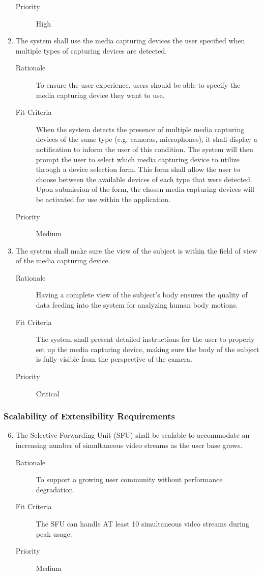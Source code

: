\documentclass{article}
\begin{document}
\begin{enumerate}[label=\textbf{PR\arabic*}]
\begin{description}
	\item[Priority] High
  \end{description}
\item The system shall use the media capturing devices the user specified when
  multiple types of capturing devices are detected. \label{PR13}
	\begin{description}
  \item[Rationale] To ensure the user experience, users should be able to specify
    the media capturing device they want to use.
	\item[Fit Criteria] When the system detects the presence of multiple media
    capturing devices of the same type (e.g. cameras, microphones), it shall
    display a notification to inform the user of this condition. The system will
    then prompt the user to select which media capturing device to utilize
    through a device selection form. This form shall allow the user to choose
    between the available devices of each type that were detected. Upon
    submission of the form, the chosen media capturing devices will be activated
    for use within the application.
	\item[Priority] Medium
  \end{description}
\item The system shall make sure the view of the subject is within the field of
  view of the media capturing device. \label{PR15}
	\begin{description}
  \item[Rationale] Having a complete view of the subject's body ensures the quality
    of data feeding into the system for analyzing human body motions.
	\item[Fit Criteria] The system shall present detailed instructions for the user
    to properly set up the media capturing device, making sure the body of the
    subject is fully visible from the perspective of the camera.
  \item[Priority] Critical
  \end{description}
\end{enumerate}

\subsubsection{Scalability of Extensibility Requirements}

\begin{enumerate}[PR1]
  \setcounter{enumi}{5}
\item The Selective Forwarding Unit (SFU) shall be scalable to accommodate
  an increasing number of simultaneous video streams as the user base
  grows. \label{PR6}
  \begin{description}
  \item[Rationale] To support a growing user community without performance
    degradation.
  \item[Fit Criteria] The SFU can handle AT least 10 simultaneous
    video streams during peak usage.
  \item[Priority] Medium
  \end{description}
\end{enumerate}
\end{document}
